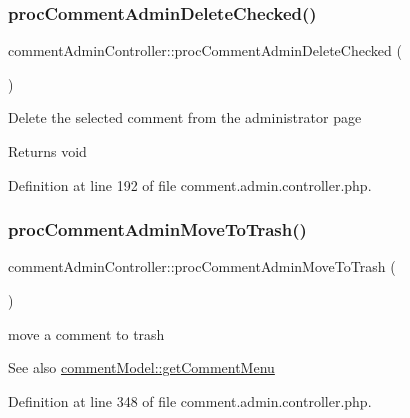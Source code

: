 \subsubsection{\texorpdfstring{proc\+Comment\+Admin\+Delete\+Checked()}{procCommentAdminDeleteChecked()}}
{\footnotesize\ttfamily comment\+Admin\+Controller\+::proc\+Comment\+Admin\+Delete\+Checked (\begin{DoxyParamCaption}{ }\end{DoxyParamCaption})}

Delete the selected comment from the administrator page \begin{DoxyReturn}{Returns}
void 
\end{DoxyReturn}


Definition at line 192 of file comment.\+admin.\+controller.\+php.

\hypertarget{classcommentAdminController_a714ff343633602dc806e0dc257a12a7f}{}\label{classcommentAdminController_a714ff343633602dc806e0dc257a12a7f} 
\subsubsection{\texorpdfstring{proc\+Comment\+Admin\+Move\+To\+Trash()}{procCommentAdminMoveToTrash()}}
{\footnotesize\ttfamily comment\+Admin\+Controller\+::proc\+Comment\+Admin\+Move\+To\+Trash (\begin{DoxyParamCaption}{ }\end{DoxyParamCaption})}



move a comment to trash 

\begin{DoxySeeAlso}{See also}
\hyperlink{classcommentModel_a74e52809b658711e8d63ba7900eb5246}{comment\+Model\+::get\+Comment\+Menu} 
\end{DoxySeeAlso}


Definition at line 348 of file comment.\+admin.\+controller.\+php.

\hypertarget{classcommentAdminController_aede089003a6f45e3982a6a7e97b63cdf}{}\label{classcommentAdminController_aede089003a6f45e3982a6a7e97b63cdf} 
